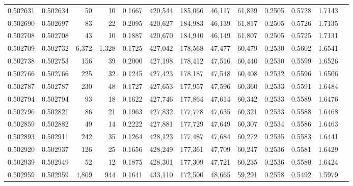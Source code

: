 \begin{tabular}{rrrrrrrrrrrrr}
0.502631 & 0.502634 &    50 &    10 &                                     0.1667 & 420,544 & 185,066 &  46,117 &  61,839 & 0.2505 & 0.5728 & 1.7143 \\
0.502690 & 0.502697 &    83 &    22 &                                     0.2095 & 420,627 & 184,983 &  46,139 &  61,817 & 0.2505 & 0.5726 & 1.7135 \\
0.502708 & 0.502708 &    43 &    10 &                                     0.1887 & 420,670 & 184,940 &  46,149 &  61,807 & 0.2505 & 0.5725 & 1.7131 \\
0.502709 & 0.502732 & 6,372 & 1,328 &                                     0.1725 & 427,042 & 178,568 &  47,477 &  60,479 & 0.2530 & 0.5602 & 1.6541 \\
0.502738 & 0.502753 &   156 &    39 &                                     0.2000 & 427,198 & 178,412 &  47,516 &  60,440 & 0.2530 & 0.5599 & 1.6526 \\
0.502766 & 0.502766 &   225 &    32 &                                     0.1245 & 427,423 & 178,187 &  47,548 &  60,408 & 0.2532 & 0.5596 & 1.6506 \\
0.502787 & 0.502787 &   230 &    48 &                                     0.1727 & 427,653 & 177,957 &  47,596 &  60,360 & 0.2533 & 0.5591 & 1.6484 \\
0.502794 & 0.502794 &    93 &    18 &                                     0.1622 & 427,746 & 177,864 &  47,614 &  60,342 & 0.2533 & 0.5589 & 1.6476 \\
0.502796 & 0.502821 &    86 &    21 &                                     0.1963 & 427,832 & 177,778 &  47,635 &  60,321 & 0.2533 & 0.5588 & 1.6468 \\
0.502859 & 0.502882 &    49 &    14 &                                     0.2222 & 427,881 & 177,729 &  47,649 &  60,307 & 0.2534 & 0.5586 & 1.6463 \\
0.502893 & 0.502911 &   242 &    35 &                                     0.1264 & 428,123 & 177,487 &  47,684 &  60,272 & 0.2535 & 0.5583 & 1.6441 \\
0.502920 & 0.502937 &   126 &    25 &                                     0.1656 & 428,249 & 177,361 &  47,709 &  60,247 & 0.2536 & 0.5581 & 1.6429 \\
0.502939 & 0.502949 &    52 &    12 &                                     0.1875 & 428,301 & 177,309 &  47,721 &  60,235 & 0.2536 & 0.5580 & 1.6424 \\
0.502959 & 0.502959 & 4,809 &   944 &                                     0.1641 & 433,110 & 172,500 &  48,665 &  59,291 & 0.2558 & 0.5492 & 1.5979 \\

\end{tabular}
